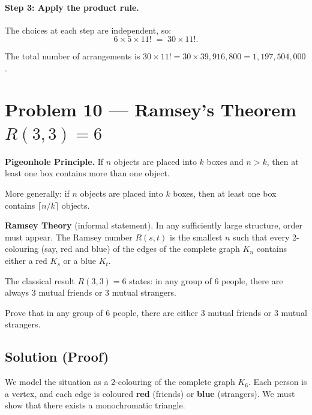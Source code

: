 \documentclass[12pt, a4paper]{article}
\begin{document}
\paragraph{Step 3: Apply the product rule.}
The choices at each step are independent, so:
\[
  6 \times 5 \times 11!
  \;=\; 30 \times 11!.
\]

\begin{answerbox}
\centering
The total number of arrangements is $\boxed{30 \times 11! = 30 \times 39{,}916{,}800 = 1{,}197{,}504{,}000}$.
\end{answerbox}

\newpage
\section{Problem 10 --- Ramsey's Theorem \texorpdfstring{$R(3,3) = 6$}{R(3,3) = 6}}

\begin{theorybox}
\textbf{Pigeonhole Principle.}\;
If $n$ objects are placed into $k$ boxes and $n > k$, then at least
one box contains more than one object.

More generally: if $n$ objects are placed into $k$ boxes, then at least
one box contains $\lceil n/k \rceil$ objects.

\medskip
\textbf{Ramsey Theory} (informal statement).
In any sufficiently large structure, order must appear.
The Ramsey number $R(s,t)$ is the smallest $n$ such that every
2-colouring (say, red and blue) of the edges of the complete graph
$K_n$ contains either a red $K_s$ or a blue $K_t$.

\medskip
The classical result $R(3,3) = 6$ states: in any group of 6 people,
there are always 3 mutual friends or 3 mutual strangers.
\end{theorybox}

\begin{problembox}
Prove that in any group of 6 people, there are either 3 mutual
friends or 3 mutual strangers.
\end{problembox}

\subsection*{Solution (Proof)}

We model the situation as a 2-colouring of the complete graph $K_6$.
Each person is a vertex, and each edge is coloured \textbf{red}
(friends) or \textbf{blue} (strangers).
We must show that there exists a monochromatic triangle.
\end{document}

